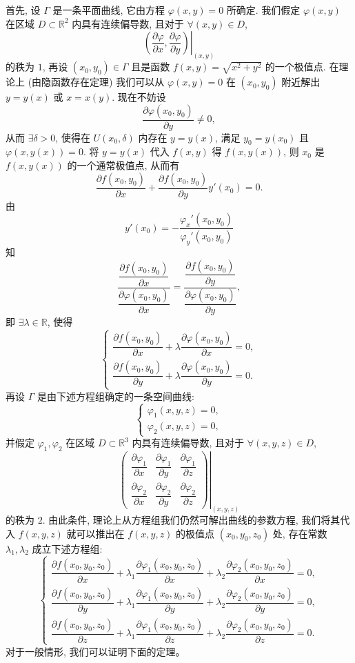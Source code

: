 \documentclass[12pt,fontset=fandol]{ctexart}
\begin{document}
首先, 设 $\Gamma$ 是一条平面曲线, 它由方程 $\varphi(x,y)=0$ 所确定. 我们假定 $\varphi(x,y)$ 在区域 $D\subset\mathbb R^2$ 内具有连续偏导数, 且对于 $\forall(x,y)\in D$,
\[
  \left.
  \left(\frac{\partial\varphi}{\partial x},\frac{\partial\varphi}{\partial y}\right)
  \right|_{(x,y)}
\]
的秩为 $1$, 再设 $(x_0,y_0)\in\Gamma$ 且是函数 $f(x,y)=\sqrt{x^2+y^2}$ 的一个极值点. 在理论上 (由隐函数存在定理) 我们可以从 $\varphi(x,y)=0$ 在 $(x_0,y_0)$ 附近解出 $y=y(x)$ 或 $x=x(y)$. 现在不妨设
\[
  \frac{\partial\varphi(x_0,y_0)}{\partial y}\ne0,
\]
从而 $\exists\delta>0$, 使得在 $U(x_0,\delta)$ 内存在 $y=y(x)$, 满足 $y_0=y(x_0)$ 且 $\varphi(x,y(x))=0$. 将 $y=y(x)$ 代入 $f(x,y)$ 得 $f(x,y(x))$, 则 $x_0$ 是 $f(x,y(x))$ 的一个通常极值点, 从而有
\[
  \frac{\partial f(x_0,y_0)}{\partial x}
  +
  \frac{\partial f(x_0,y_0)}{\partial y}y'(x_0)=0.
\]
由
\[
  y'(x_0)=-\frac{\varphi_x'(x_0,y_0)}{\varphi_y'(x_0,y_0)}
\]
知
\[
  \frac{\dfrac{\partial f(x_0,y_0)}{\partial x}}
       {\dfrac{\partial\varphi(x_0,y_0)}{\partial x}}
  =
  \frac{\dfrac{\partial f(x_0,y_0)}{\partial y}}
       {\dfrac{\partial\varphi(x_0,y_0)}{\partial y}},
\]
即 $\exists\lambda\in\mathbb R$, 使得
\[
  \begin{cases}
    \dfrac{\partial f(x_0,y_0)}{\partial x}
    +\lambda\dfrac{\partial\varphi(x_0,y_0)}{\partial x}=0,\\[1.2ex]
    \dfrac{\partial f(x_0,y_0)}{\partial y}
    +\lambda\dfrac{\partial\varphi(x_0,y_0)}{\partial y}=0.
  \end{cases}
\]
再设 $\Gamma$ 是由下述方程组确定的一条空间曲线:
\[
  \begin{cases}
    \varphi_1(x,y,z)=0,\\
    \varphi_2(x,y,z)=0,
  \end{cases}
\]
并假定 $\varphi_1,\varphi_2$ 在区域 $D\subset\mathbb R^3$ 内具有连续偏导数, 且对于 $\forall(x,y,z)\in D$,
\[
  \left.
  \begin{pmatrix}
    \dfrac{\partial\varphi_1}{\partial x} &
    \dfrac{\partial\varphi_1}{\partial y} &
    \dfrac{\partial\varphi_1}{\partial z}\\
    \dfrac{\partial\varphi_2}{\partial x} &
    \dfrac{\partial\varphi_2}{\partial y} &
    \dfrac{\partial\varphi_2}{\partial z}
  \end{pmatrix}
  \right|_{(x,y,z)}
\]
的秩为 $2$. 由此条件, 理论上从方程组我们仍然可解出曲线的参数方程, 我们将其代入 $f(x,y,z)$ 就可以推出在 $f(x,y,z)$ 的极值点 $(x_0,y_0,z_0)$ 处, 存在常数 $\lambda_1,\lambda_2$ 成立下述方程组:
\[
  \begin{cases}
    \dfrac{\partial f(x_0,y_0,z_0)}{\partial x}
    +\lambda_1\dfrac{\partial\varphi_1(x_0,y_0,z_0)}{\partial x}
    +\lambda_2\dfrac{\partial\varphi_2(x_0,y_0,z_0)}{\partial x}=0,\\[1.2ex]
    \dfrac{\partial f(x_0,y_0,z_0)}{\partial y}
    +\lambda_1\dfrac{\partial\varphi_1(x_0,y_0,z_0)}{\partial y}
    +\lambda_2\dfrac{\partial\varphi_2(x_0,y_0,z_0)}{\partial y}=0,\\[1.2ex]
    \dfrac{\partial f(x_0,y_0,z_0)}{\partial z}
    +\lambda_1\dfrac{\partial\varphi_1(x_0,y_0,z_0)}{\partial z}
    +\lambda_2\dfrac{\partial\varphi_2(x_0,y_0,z_0)}{\partial z}=0.
  \end{cases}
\]
对于一般情形, 我们可以证明下面的定理。
\end{document}

